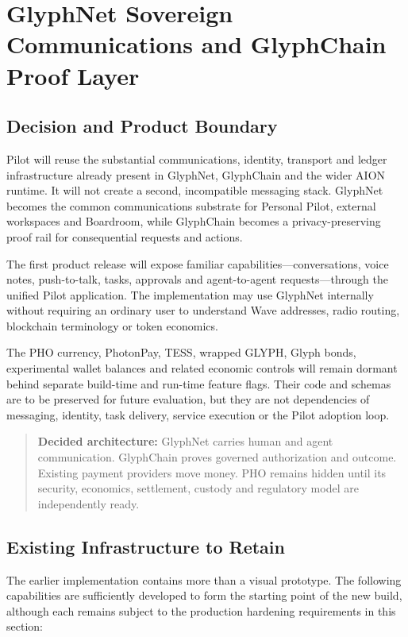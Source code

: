 \section{GlyphNet Sovereign Communications and GlyphChain Proof Layer}
\label{sec:pilot-glyphnet-proof-layer}

\subsection{Decision and Product Boundary}

Pilot will reuse the substantial communications, identity, transport and ledger
infrastructure already present in GlyphNet, GlyphChain and the wider AION
runtime. It will not create a second, incompatible messaging stack. GlyphNet
becomes the common communications substrate for Personal Pilot, external
workspaces and Boardroom, while GlyphChain becomes a privacy-preserving proof
rail for consequential requests and actions.

The first product release will expose familiar capabilities---conversations,
voice notes, push-to-talk, tasks, approvals and agent-to-agent requests---through
the unified Pilot application. The implementation may use GlyphNet internally
without requiring an ordinary user to understand Wave addresses, radio routing,
blockchain terminology or token economics.

The PHO currency, PhotonPay, TESS, wrapped GLYPH, Glyph bonds, experimental
wallet balances and related economic controls will remain dormant behind
separate build-time and run-time feature flags. Their code and schemas are to be
preserved for future evaluation, but they are not dependencies of messaging,
identity, task delivery, service execution or the Pilot adoption loop.

\begin{quote}
\textbf{Decided architecture:} GlyphNet carries human and agent communication.
GlyphChain proves governed authorization and outcome. Existing payment
providers move money. PHO remains hidden until its security, economics,
settlement, custody and regulatory model are independently ready.
\end{quote}

\subsection{Existing Infrastructure to Retain}

The earlier implementation contains more than a visual prototype. The following
capabilities are sufficiently developed to form the starting point of the new
build, although each remains subject to the production hardening requirements
in this section:

